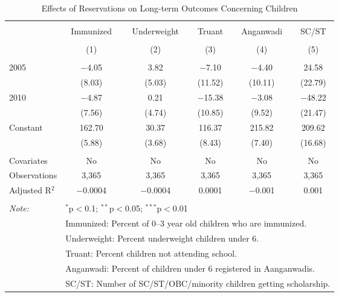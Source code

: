 
\begin{table}[!htbp] \centering 
  \caption{Effects of Reservations on Long-term Outcomes Concerning Children} 
  \label{raj_shrug_children_05_10} 
\scriptsize 
\begin{tabular}{@{\extracolsep{1pt}}lccccc} 
\\[-1.8ex]\hline 
\hline \\[-1.8ex] 
 & Immunized & Underweight & Truant & Anganwadi & SC/ST \\ 
\\[-1.8ex] & (1) & (2) & (3) & (4) & (5)\\ 
\hline \\[-1.8ex] 
 2005 & $-$4.05 & 3.82 & $-$7.10 & $-$4.40 & 24.58 \\ 
  & (8.03) & (5.03) & (11.52) & (10.11) & (22.79) \\ 
  2010 & $-$4.87 & 0.21 & $-$15.38 & $-$3.08 & $-$48.22 \\ 
  & (7.56) & (4.74) & (10.85) & (9.52) & (21.47) \\ 
  Constant & 162.70 & 30.37 & 116.37 & 215.82 & 209.62 \\ 
  & (5.88) & (3.68) & (8.43) & (7.40) & (16.68) \\ 
 \hline \\[-1.8ex] 
Covariates & No & No & No & No & No \\ 
Observations & 3,365 & 3,365 & 3,365 & 3,365 & 3,365 \\ 
Adjusted R$^{2}$ & $-$0.0004 & $-$0.0004 & 0.0001 & $-$0.001 & 0.001 \\ 
\hline 
\hline \\[-1.8ex] 
\textit{Note:}  & \multicolumn{5}{l}{$^{*}$p$<$0.1; $^{**}$p$<$0.05; $^{***}$p$<$0.01} \\ 
 & \multicolumn{5}{l}{Immunized: Percent of 0--3 year old children who are immunized.} \\ 
 & \multicolumn{5}{l}{Underweight: Percent underweight children under 6.} \\ 
 & \multicolumn{5}{l}{Truant: Percent children not attending school.} \\ 
 & \multicolumn{5}{l}{Anganwadi: Percent of children under 6 registered in Aanganwadis.} \\ 
 & \multicolumn{5}{l}{SC/ST: Number of SC/ST/OBC/minority children getting scholarship.} \\ 
\end{tabular} 
\end{table} 
